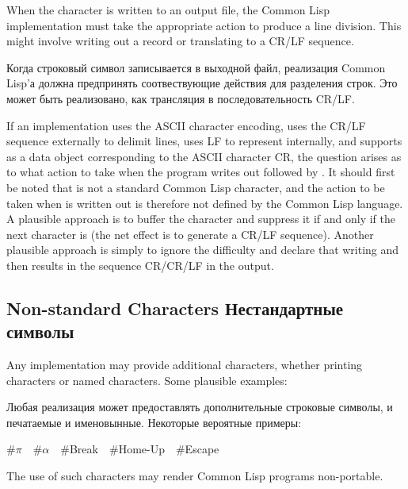 When the character  is written to an output file,
the Common Lisp implementation must take the appropriate action
to produce a line division.  This might involve writing out a
record or translating  to a CR/LF sequence.

Когда строковый символ  записывается в выходной файл,
реализация Common Lisp'а должна предпринять соотвествующие действия для
разделения строк. Это может быть реализовано, как трансляция
 в последовательность CR/LF.

\beforenoterule
\begin{implementation}
If an implementation uses the ASCII character encoding,
uses the CR/LF sequence externally to delimit lines,
uses LF to represent  internally, and supports 
as a data object corresponding to the ASCII character CR, the
question arises as to what action to take when the program
writes out  followed by .
It should first be noted that  is not a standard Common Lisp
character, and the action to be taken when  is written out
is therefore not defined by the Common Lisp language.  A plausible approach
is to buffer the  character and suppress it if and only if the
next character is  (the net effect is to generate a CR/LF
sequence).
Another plausible
approach is simply to ignore
the difficulty and declare that writing  and then
 results in the sequence CR/CR/LF in the output.
\end{implementation}
\afternoterule

\subsection{Non-standard Characters Нестандартные символы}

Any implementation may provide additional characters, whether printing
characters or named characters.  Some plausible examples:

Любая реализация может предоставлять дополнительные строковые символы, и
печатаемые и именовынные. Некоторые вероятные примеры:

\newpage%

\begin{lisp}
\#{\Xbackslash}\(\pi\)~~\#{\Xbackslash}\(\alpha\)~~\#{\Xbackslash}Break~~\#{\Xbackslash}Home-Up~~\#{\Xbackslash}Escape
\end{lisp}
The use of such characters may render Common Lisp programs non-portable.

